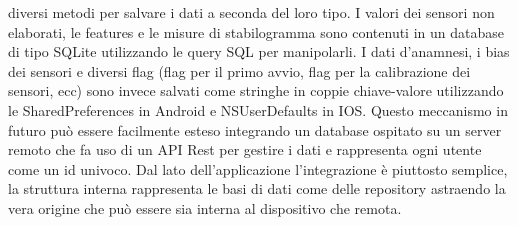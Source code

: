 diversi metodi per salvare i dati a seconda del loro tipo. I valori dei sensori non elaborati, le features e le misure di stabilogramma sono contenuti in un database di tipo SQLite utilizzando le query SQL per manipolarli. I dati d'anamnesi, i bias dei sensori e diversi flag (flag per il primo avvio, flag per la calibrazione dei sensori, ecc) sono invece salvati come stringhe in coppie chiave-valore utilizzando le SharedPreferences in Android e NSUserDefaults in IOS. Questo meccanismo in futuro può essere facilmente esteso integrando un database ospitato su un server remoto che fa uso di un API Rest per gestire i dati e rappresenta ogni utente come un id univoco. Dal lato dell'applicazione l'integrazione è piuttosto semplice, la struttura interna rappresenta le basi di dati come delle repository astraendo la vera origine che può essere sia interna al dispositivo che remota.